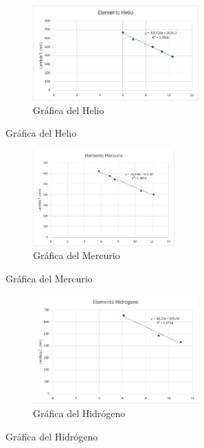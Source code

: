 \begin{figure}[H]
  \centering
  \begin{subfigure}[b]{\textwidth}
      \centering
      \includegraphics[width=0.7\textwidth]{Figures/1. Content/grafica-experimento-2-helio.png}
      \caption{Gráfica del Helio}
      \label{fig: Grafica del Helio}
  \end{subfigure}
  \hfill
\end{figure}

\begin{figure}[H]
  \centering
  \begin{subfigure}[b]{\textwidth}
      \centering
      \includegraphics[width=0.6\textwidth]{Figures/1. Content/grafica-experimento-2-mercurio.png}
      \caption{Gráfica del Mercurio}
      \label{fig: Grafica del Mercurio}
    \end{subfigure}
  \hfill
\end{figure}

\begin{figure}[H]
  \centering
  \begin{subfigure}[b]{\textwidth}
      \centering
      \includegraphics[width=0.7\textwidth]{Figures/1. Content/grafica-experimento-2-hidrogeno.png}
      \caption{Gráfica del Hidrógeno}
      \label{fig: Grafica del Hidrogeno}
  \end{subfigure}
  \hfill
\end{figure}

